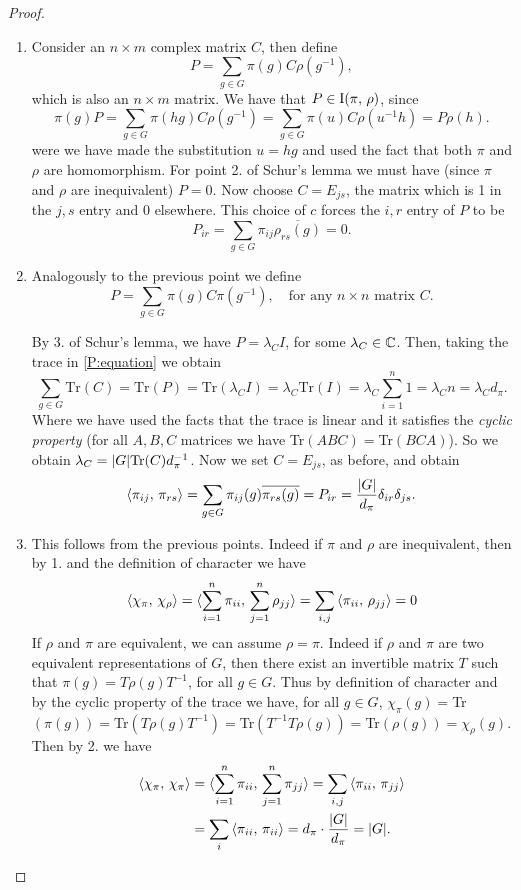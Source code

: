 \begin{proof}~ 
\begin{enumerate}
\item Consider an $n\times m$ complex matrix $C$, then define
\begin{equation*}
P=\sum_{g\in G}\pi(g)C\rho(g^{-1}),
\end{equation*}
which is also an $n\times m$ matrix. We have that $P\in \operatorname{I}(\pi, \, \rho)$, since
\[
\pi(g)P=\sum_{g \in G}\pi(hg)C\rho(g^{-1})=\sum_{g\in G}\pi(u)C\rho(u^{-1}h)=P\rho(h).
\]
were we have made the substitution $u=hg$ and  used the fact that both $\pi$ and $\rho$ are homomorphism. For point 2. of Schur's lemma we must have (since $\pi$ and $\rho$ are inequivalent) $P=0$. Now choose $C=E_{js}$, the matrix which is 1 in the $j,s$ entry and 0 elsewhere. This choice of $c$ forces the $i,r$ entry of $P$ to be 
\[
P_{ir}=\sum_{g\in G}\pi_{ij}\overline{\rho_{rs}(g)}=0.
\]
\item Analogously to the previous point we define 
\begin{equation}
\label{P:equation}
P=\sum_{g\in G}\pi(g)C\pi(g^{-1}), \quad \text{for any $n\times n$ matrix $C$.}
\end{equation}

By 3. of Schur's lemma, we have $P=\lambda_CI$, for some $\lambda_C\in {\mathbb C}$. Then, taking the trace in \ref{P:equation} we obtain
\[
\text{$\sum_{g\in G}$Tr$(C)=$Tr$(P)=$Tr$(\lambda_CI)=\lambda_C$Tr$(I)=\lambda_C\sum_{i=1}^n 1=\lambda_Cn=\lambda_Cd_\pi.$}
\]  
Where we have used the facts that the trace is linear and it satisfies the \emph{cyclic property} (for all $A,B,C$ matrices we have Tr$(ABC)=$Tr$(BCA)$). So we obtain $\lambda_C=\lvert G\rvert \text{Tr$(C)d_\pi^{-1}$}$. Now we set $C=E_{js}$, as before, and obtain 
\[
\braket{\pi_{ij},\, \pi_{rs}}=\sum_{g\in G}\pi_{ij}(g)\overline{\pi_{rs}(g)}=P_{ir}=\frac{\lvert G\rvert}{d_\pi}\delta_{ir}\delta_{js}.
\]
\item This follows from the previous points. Indeed if $\pi$ and $\rho$ are inequivalent, then by 1. and the definition of character we have
\[
\braket{\chi_\pi,\, \chi_\rho}=\braket{\sum_{i=1}^n\pi_{ii},\, \sum_{j=1}^n\rho_{jj} }=\sum_{i,j}\braket{\pi_{ii},\, \rho_{jj} }=0
\]
If $\rho$ and $\pi$ are equivalent, we can assume $\rho=\pi$. Indeed if $\rho$ and $\pi$ are two equivalent representations of $G$, then there exist  an invertible matrix $T$ such that $\pi(g)=T\rho(g)T^{-1}$, for all $g\in G$. Thus by definition of character and by the cyclic property of the trace we have, for all $g\in G$, $\chi_\pi(g)=$Tr$(\pi(g))=$Tr$(T\rho(g)T^{-1})=$Tr$(T^{-1}T\rho(g))= $Tr$(\rho(g))=\chi_\rho(g)$. Then by 2. we have
\[
\begin{split}
\braket{\chi_\pi,\, \chi_\pi}&=\braket{\sum_{i=1}^n\pi_{ii},\, \sum_{j=1}^n\pi_{jj} }=\sum_{i,j}\braket{\pi_{ii},\, \pi_{jj} }\\
&=\sum_{i}\braket{\pi_{ii},\, \pi_{ii} }=d_\pi\cdot\frac{\lvert G\rvert}{d_\pi}=\lvert G\rvert.
\end{split}
\]
\end{enumerate}
\end{proof}
